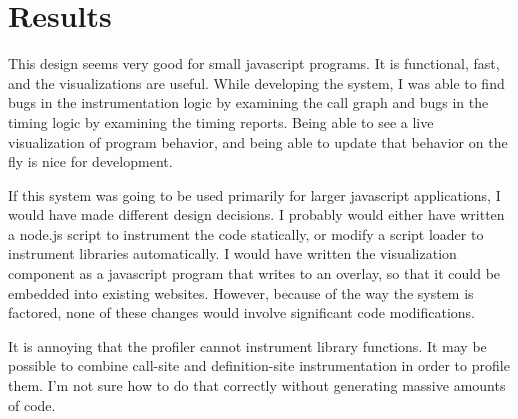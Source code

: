 \documentclass{article}
\begin{document}
\section*{Results}

This design seems very good for small javascript programs. It is functional, fast, and the visualizations are useful. While developing the system, I was able to find bugs in the instrumentation logic by examining the call graph and bugs in the timing logic by examining the timing reports. Being able to see a live visualization of program behavior, and being able to update that behavior on the fly is nice for development.

If this system was going to be used primarily for larger javascript applications, I would have made different design decisions. I probably would either have written a node.js script to instrument the code statically, or modify a script loader to instrument libraries automatically. I would have written the visualization component as a javascript program that writes to an overlay, so that it could be embedded into existing websites. However, because of the way the system is factored, none of these changes would involve significant code modifications.

It is annoying that the profiler cannot instrument library functions. It may be possible to combine call-site and definition-site instrumentation in order to profile them. I'm not sure how to do that correctly without generating massive amounts of code.

{}
\nocite{*}

\end{document}
